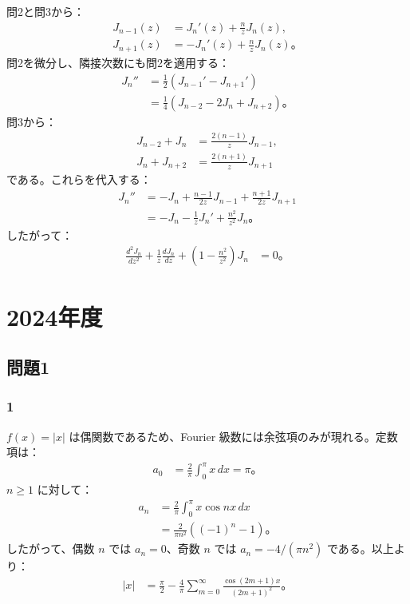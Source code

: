 \documentclass[platex,dvipdfmx,a4paper]{jsarticle}
\newcommand{\bbn}[2]{\frac{d #1}{d #2}}
\newcommand{\nbbn}[3]{\frac{d^{#1} #2}{d #3^{#1}}}
\begin{document}
問2と問3から：
\begin{align*}
  J_{n-1}(z)&=J_n'(z)+\frac{n}{z}J_n(z),\\
  J_{n+1}(z)&=-J_n'(z)+\frac{n}{z}J_n(z)。
\end{align*}
問2を微分し、隣接次数にも問2を適用する：
\begin{align*}
  J_n''
  &=\frac{1}{2}\left(J_{n-1}'-J_{n+1}'\right) \\
  &=\frac{1}{4}\left(J_{n-2}-2J_n+J_{n+2}\right)。
\end{align*}
問3から：
\begin{align*}
  J_{n-2}+J_n&=\frac{2(n-1)}{z}J_{n-1},\\
  J_n+J_{n+2}&=\frac{2(n+1)}{z}J_{n+1}
\end{align*}
である。これらを代入する：
\begin{align*}
  J_n''
  &=-J_n+\frac{n-1}{2z}J_{n-1}+\frac{n+1}{2z}J_{n+1} \\
  &=-J_n-\frac{1}{z}J_n'+\frac{n^2}{z^2}J_n。
\end{align*}
したがって：
\begin{align*}
  \nbbn{2}{J_n}{z}
  +\frac{1}{z}\bbn{J_n}{z}
  +\left(1-\frac{n^2}{z^2}\right)J_n
  &=0。
\end{align*}

\section*{2024年度}

\subsection*{問題1}

\subsubsection*{1}

$f(x)=|x|$ は偶関数であるため、Fourier 級数には余弦項のみが現れる。定数項は：
\begin{align*}
  a_0
  &=\frac{2}{\pi}\int_0^\pi x\,dx
   =\pi。
\end{align*}
$n\geq1$ に対して：
\begin{align*}
  a_n
  &=\frac{2}{\pi}\int_0^\pi x\cos nx\,dx \\
  &=\frac{2}{\pi n^2}\left((-1)^n-1\right)。
\end{align*}
したがって、偶数 $n$ では $a_n=0$、奇数 $n$ では $a_n=-4/(\pi n^2)$ である。以上より：
\begin{align*}
  |x|
  &=\frac{\pi}{2}-\frac{4}{\pi}\sum_{m=0}^{\infty}
    \frac{\cos(2m+1)x}{(2m+1)^2}。
\end{align*}
\end{document}
